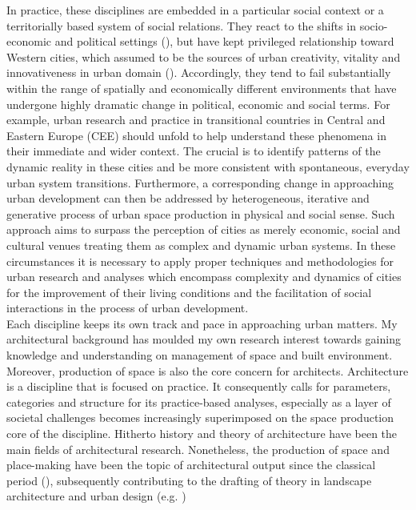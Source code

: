 \documentclass[11pt]{report}
\begin{document}
In practice, these disciplines are embedded in a particular social context or a territorially based system of social relations. They react to the shifts in socio-economic and political settings (\href{Tsenkova, 2006b}{\citealt{Tsenkova, 2006b}}), but have kept privileged relationship toward Western cities, which assumed to be the sources of urban creativity, vitality and innovativeness in urban domain (\href{Robinson, 2006:2}{\citealt{Robinson, 2006:2}}). Accordingly, they tend to fail substantially within the range of spatially and economically different environments that have undergone highly dramatic change in political, economic and social terms. For example, urban research and practice in transitional countries in Central and Eastern Europe (CEE) should unfold to help understand these phenomena in their immediate and wider context. The crucial is to identify patterns of the dynamic reality in these cities and be more consistent with spontaneous, everyday urban system transitions. Furthermore, a corresponding change in approaching urban development can then be addressed by heterogeneous, iterative and generative process of urban space production in physical and social sense. Such approach aims to surpass the perception of cities as merely economic, social and cultural venues treating them as complex and dynamic urban systems. In these circumstances it is necessary to apply proper techniques and methodologies for urban research and analyses which encompass complexity and dynamics of cities for the improvement of their living conditions and the facilitation of social interactions in the process of urban development.
\\
Each discipline keeps its own track and pace in approaching urban matters. My architectural background has moulded my own research interest towards gaining knowledge and understanding on management of space and built environment. Moreover, production of space is also the core concern for architects. Architecture is a discipline that is focused on practice. It consequently calls for parameters, categories and structure for its practice-based analyses, especially as a layer of societal challenges becomes increasingly superimposed on the space production core of the discipline.  
Hitherto history and theory of architecture have been the main fields of architectural research.
Nonetheless, the production of space and place-making have been the topic of architectural output since the classical period  (\href{Braunfels, 1990; Rossi, 1982; Vitruvius, 20BC; from Van Assche et al. 2013}{\citealt{Braunfels, 1990; Rossi, 1982; Vitruvius, 20BC; from Van Assche et al. 2013}}), subsequently contributing to the drafting of theory in landscape architecture and urban design (e.g. \href{Child, 2010; Braunfels, 1990; Rossi, 1982; Duany and Plater-Zyberk, 1991; Lynch, 1981 from Van Assche et al. 2013}{\citealt{Child, 2010; Braunfels, 1990; Rossi, 1982; Duany and Plater-Zyberk, 1991; Lynch, 1981 from Van Assche et al. 2013}})
\end{document}

